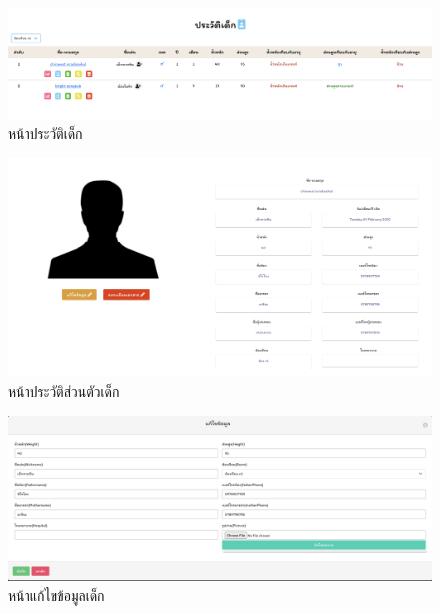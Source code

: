   \begin{figure}
    \begin{center}
    \includegraphics[width=\linewidth]{images/Profile.png}
    \end{center}
    \caption[หน้าประวัติเด็ก]{หน้าประวัติเด็ก}
    \label{fig:Profile}
  \end{figure}



  \begin{figure}
    \begin{center}
    \includegraphics[width=\linewidth]{images/ProfileInfo.png}
    \end{center}
    \caption[หน้าประวัติส่วนตัวเด็ก]{หน้าประวัติส่วนตัวเด็ก}
    \label{fig:ProfileTwo}
  \end{figure}


  \begin{figure}
    \begin{center}
    \includegraphics[width=\linewidth]{images/updateProfile.png}
    \end{center}
    \caption[หน้าแก้ไขข้อมูลเด็ก]{หน้าแก้ไขข้อมูลเด็ก}
    \label{fig:UpdateProfile}
    \end{figure}



